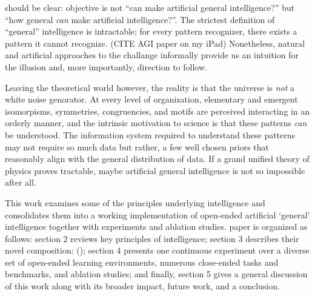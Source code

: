 \We should be clear: \our objective is not ``can \we make artificial general intelligence?'' but ``how general \textit{can} \we make artificial intelligence?''. The strictest definition of ``general'' intelligence is intractable; for every pattern recognizer, there exists a pattern it cannot recognize. (CITE AGI paper on my iPad) Nonetheless, natural and artificial approaches to the challange informally provide us an intuition for the illusion and, more importantly, direction to follow.

Leaving the theoretical world however, the reality is that the universe is \textit{not} a white noise genorator. At every level of organization, elementary and emergent isomorpisms, symmetries, congruencies, and motifs are perceived interacting in an orderly manner, and the intrinsic motivation to science is that these patterns \textit{can} be understood. The information system required to understand these patterns may not require so much data but rather, a few well chosen priors that reasonably align with the general distribution of data. If a grand unified theory of physics proves tractable, maybe artificial general intelligence is not so impossible after all.
    
This work examines some of the principles underlying intelligence and consolidates them into a working implementation of open-ended artificial `general' intelligence together with experiments and ablation studies. \Our paper is organized as follows: section 2 reviews key principles of intelligence; section 3 describes their novel composition: \pgi (\PGI); section 4 presents one continuous experiment over a diverse set of open-ended learning environments, numerous close-ended tasks and benchmarks, and ablation studies; and finally, section 5 gives a general discussion of this work along with its broader impact, future work, and a conclusion.   
